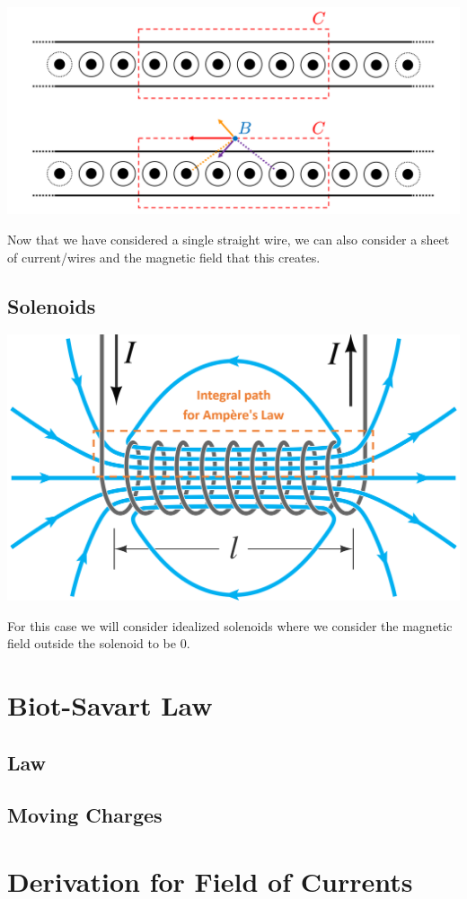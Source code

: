 \hfil \includegraphics[scale=0.15]{assets/amp-law-current-sheet.png}

Now that we have considered a single straight wire, we can also consider a sheet of current/wires and the magnetic field that this creates.

\subsection{Solenoids}

\hfil \includegraphics[scale=0.1]{assets/amp-law-solenoid.png}

For this case we will consider idealized solenoids where we consider the magnetic field outside the solenoid to be 0.

\section{Biot-Savart Law}

\subsection{Law}


\subsection{Moving Charges}


\section{Derivation for Field of Currents}